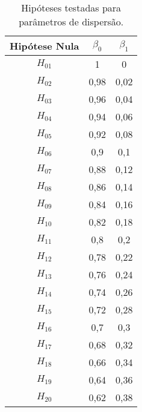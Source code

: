 
\begin{table}[H]
\centering
\begin{tabular}{c|cc}
\hline
Hipótese Nula & $\beta_0$ & $\beta_1$ \\ \hline
$H_{01}$      & 1         & 0         \\
$H_{02}$      & 0,98      & 0,02      \\
$H_{03}$      & 0,96      & 0,04      \\
$H_{04}$      & 0,94      & 0,06      \\
$H_{05}$      & 0,92      & 0,08      \\
$H_{06}$      & 0,9       & 0,1       \\
$H_{07}$      & 0,88      & 0,12      \\
$H_{08}$      & 0,86      & 0,14      \\
$H_{09}$      & 0,84      & 0,16      \\
$H_{10}$      & 0,82      & 0,18      \\
$H_{11}$      & 0,8       & 0,2       \\
$H_{12}$      & 0,78      & 0,22      \\
$H_{13}$      & 0,76      & 0,24      \\
$H_{14}$      & 0,74      & 0,26      \\
$H_{15}$      & 0,72      & 0,28      \\
$H_{16}$      & 0,7       & 0,3       \\
$H_{17}$      & 0,68      & 0,32      \\
$H_{18}$      & 0,66      & 0,34      \\
$H_{19}$      & 0,64      & 0,36      \\
$H_{20}$      & 0,62      & 0,38      \\ \hline
\end{tabular}
\caption{Hipóteses testadas para parâmetros de dispersão.}
\label{tab:hipoteses_taus}
\end{table}

